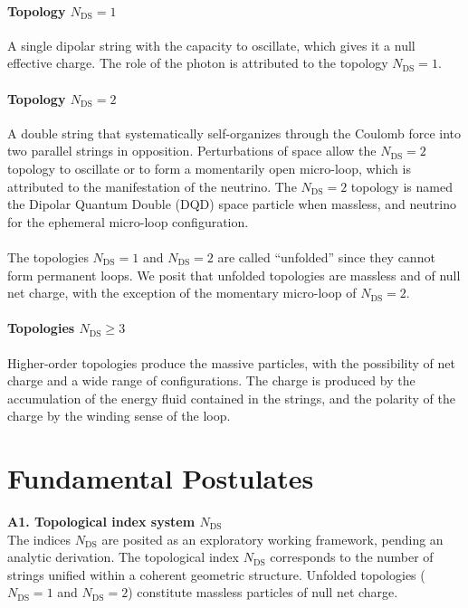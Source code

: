 \documentclass[11pt,a4paper]{article}
\theoremstyle{plain}
\theoremstyle{remark}
\newcommand{\Ncd}{\ensuremath{N_{\mathrm{DS}}}}
\begin{document}
\paragraph{Topology $\Ncd = 1$}
A single dipolar string with the capacity to oscillate, which gives it a null effective charge. The role of the photon is attributed to the topology $\Ncd = 1$.

\paragraph{Topology $\Ncd = 2$}
A double string that systematically self-organizes through the Coulomb force into two parallel strings in opposition. Perturbations of space allow the $\Ncd = 2$ topology to oscillate or to form a momentarily open micro-loop, which is attributed to the manifestation of the neutrino. The $\Ncd = 2$ topology is named the Dipolar Quantum Double (DQD) space particle when massless, and neutrino for the ephemeral micro-loop configuration.

\paragraph{}
The topologies $\Ncd = 1$ and $\Ncd = 2$ are called ``unfolded'' since they cannot form permanent loops. We posit that unfolded topologies are massless and of null net charge, with the exception of the momentary micro-loop of $\Ncd = 2$.

\paragraph{Topologies $\Ncd \geq 3$}
Higher-order topologies produce the massive particles, with the possibility of net charge and a wide range of configurations. The charge is produced by the accumulation of the energy fluid contained in the strings, and the polarity of the charge by the winding sense of the loop.

\section{Fundamental Postulates}

\textbf{A1. Topological index system $\Ncd$}\\
The indices $\Ncd$ are posited as an exploratory working framework, pending an analytic derivation. The topological index $\Ncd$ corresponds to the number of strings unified within a coherent geometric structure. Unfolded topologies ($\Ncd = 1$ and $\Ncd = 2$) constitute massless particles of null net charge.
\end{document}
